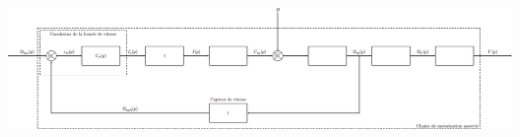 \documentclass[10pt,fleqn]{article} %
\begin{document}
\begin{center}
\includegraphics[width=\linewidth]{images/fig_02}
\end{center}
\end{document}
